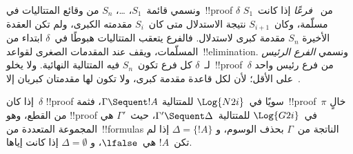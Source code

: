\documentclass[../../../include/open-logic-section]{subfiles}
\begin{document}
ونسمي قائمة~$S_1$، \dots، $S_n$ من وقائع المتتاليات في~!!{proof}
$\delta$ من~ \emph{فرعًا} إذا كانت~$S_1$ مسلّمة، وكان~$S_{i+1}$
نتيجة الاستدلال متى كان~$S_i$ مقدمته الكبرى، ولم تكن العقدة الأخيرة
$S_n$ مقدمة كبرى لاستدلال. فالفرع يتعقب المتتاليات هبوطًا في~$\delta$
ابتداء من المسلّمات، ويقف عند المقدمات الصغرى لقواعد~!!{elimination}.
ونسمي \emph{الفرع الرئيس} لـ~$\delta$ كل فرع تكون~$S_n$ فيه المتتالية
النهائية. ولا يخلو~!!{proof}~$\delta$ من فرع رئيس واحد على الأقل؛ لأن
لكل قاعدة مقدمة كبرى، ولا تكون لها مقدمتان كبريان إلا~\Intro{\land}.

\begin{prop}
إذا كان~$\delta$ !!{proof} سويًا في~$\Log{N2i}$ للمتتالية
$\Gamma \Sequent !A$، فثمة~!!{proof}~$\pi$ خالٍ من القطع، وهو
!!{proof} في~$\Log{G2i}$
للمتتالية~$\Gamma' \Sequent \Delta$، حيث~$\Gamma'$ هي المجموعة المتعددة
من~!!{formula}s الناتجة من~$\Gamma$ بحذف الوسوم، و
$\Delta=\{!A\}$ إذا لم تكن~$!A$ هي~$\lfalse$، و
$\Delta=\emptyset$ إذا كانت إياها.
\end{prop}
\end{document}
